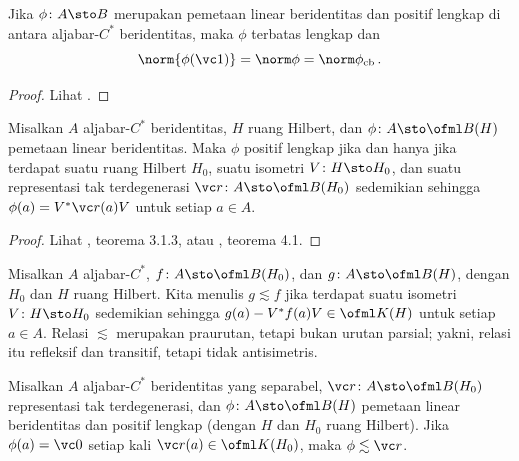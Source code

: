 \begin{prop}\label{00582921} Jika $\phi\colon A \sto B$ merupakan pemetaan linear beridentitas dan positif lengkap
di antara aljabar-$C^*$ beridentitas, maka $\phi$ terbatas lengkap dan
   \[ \norm{\phi(\vc 1)} = \norm\phi = \norm\phi_{\mathrm{cb}}\,. \]
\end{prop}

\begin{proof} Lihat \cite{Paulsen:2002}. \ns \end{proof}

\begin{thm}\label{005831} Misalkan $A$ aljabar-$C^*$ beridentitas,
$H$ ruang Hilbert, dan $\phi\colon A \sto \ofml B(H)$ pemetaan linear beridentitas.
Maka $\phi$ positif lengkap jika dan hanya jika terdapat suatu ruang Hilbert
$H_0$, suatu isometri $V\colon H \sto H_0$, dan suatu representasi tak terdegenerasi $\vc
r\colon A \sto \ofml B(H_0)$ sedemikian sehingga $\phi(a) = V^*\vc r(a)V$ untuk setiap $a \in A$.
\end{thm}

\begin{proof} Lihat \cite{HigsonR:2000}, teorema 3.1.3, atau \cite{Paulsen:2002}, teorema 4.1. \ns
\end{proof}

\begin{notn} Misalkan $A$ aljabar-$C^*$, $f\colon A \sto \ofml B(H_0)$, dan
$g\colon A \sto \ofml B(H)$, dengan $H_0$ dan $H$ ruang Hilbert. Kita menulis
$g \lesssim f$ jika terdapat suatu isometri $V\colon H \sto H_0$ sedemikian sehingga $g(a) -
V^*f(a)V \in \ofml K(H)$ untuk setiap $a \in A$. Relasi $\lesssim$ merupakan praurutan,
tetapi bukan urutan parsial; yakni, relasi itu refleksif dan transitif, tetapi tidak
antisimetris.
\end{notn}

\begin{thm}[Voiculescu]\label{0058335} Misalkan $A$ aljabar-$C^*$ beridentitas yang separabel,
$\vc r\colon A \sto \ofml B(H_0)$ representasi tak terdegenerasi, dan
$\phi\colon A \sto \ofml B(H)$ pemetaan linear beridentitas dan positif lengkap (dengan $H$ dan $H_0$ ruang Hilbert). Jika $\phi(a) =
\vc 0$ setiap kali $\vc r(a) \in \ofml K(H_0)$, maka $\phi \lesssim \vc r$.
\end{thm}

